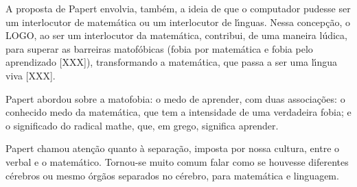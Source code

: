 \documentclass[
12pt,		%
openright,	%
twoside,  %
a4paper,			%
chapter=TITLE,		%
english,			%
french,				%
spanish,			%
brazil				%
]{USPSC-classe/USPSC}
\begin{document}
A proposta de Papert envolvia, tamb\'em, a ideia de que o computador pudesse ser um interlocutor  de matem\'atica ou um interlocutor de l\'{\i}nguas. Nessa concep\c{c}\~ao, o LOGO, ao ser um interlocutor da matem\'atica, contribui, de uma maneira l\'udica, para superar as barreiras matof\'obicas (fobia por matem\'atica e fobia pelo aprendizado [XXX]), transformando a matem\'atica, que passa a ser uma l\'{\i}ngua viva [XXX].









Papert abordou sobre a \textquotedbl matofobia: o medo de aprender\textquotedbl , com duas associa\c{c}\~oes: o conhecido medo da matem\'atica, que tem a intensidade de uma verdadeira fobia; e o  significado do radical mathe, que, em grego, significa aprender.










\noindent\begin{center}\mbox{\centering{}}\end{center}


Papert chamou aten\c{c}\~ao quanto \`a separa\c{c}\~ao, imposta por nossa cultura, entre o verbal e o matem\'atico. Tornou-se muito comum falar como se houvesse diferentes c\'erebros ou mesmo \'org\~aos separados no c\'erebro, para matem\'atica e linguagem.
\end{document}
